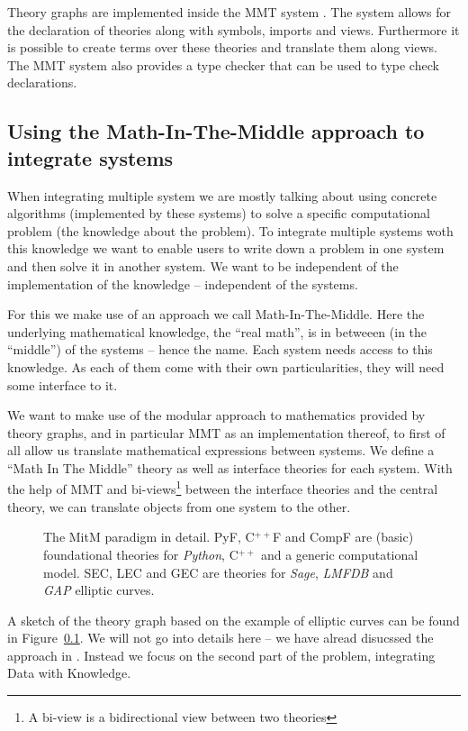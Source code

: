 \documentclass{deliverablereport}
\begin{document}
Theory graphs are implemented inside the MMT system \cite{RabKoh:WSMSML13}. The system allows for the declaration of theories along with symbols, imports and views. Furthermore it is possible to create terms over these theories and translate them along views. The MMT system also provides a type checker that can be used to type check declarations.

\subsection{Using the Math-In-The-Middle approach to integrate systems}\label{sec:mitm}

When integrating multiple system we are mostly talking about using concrete algorithms (implemented by these systems) to solve a specific computational problem (the knowledge about the problem). To integrate multiple systems woth this knowledge we want to enable users to write down a problem in one system and then solve it in another system. We want to be independent of the implementation of the knowledge -- independent of the systems.

For this we make use of an approach we call Math-In-The-Middle. Here the underlying mathematical knowledge, the ``real math'', is in betweeen (in the ``middle'') of the systems -- hence the name. Each system needs access to this knowledge. As each of them come with their own particularities, they will need some interface to it.

We want to make use of the modular approach to mathematics provided by theory graphs, and in particular MMT as an implementation thereof, to first of all allow us translate mathematical expressions between systems. We define a ``Math In The Middle'' theory as well as interface theories for each system. With the help of MMT and bi-views\footnote{A bi-view is a bidirectional view between two theories} between the interface theories and the central theory, we can translate objects from one system to the other.

\begin{figure}[ht]\centering
  
  \caption{The MitM paradigm in detail. PyF, C${}^{++}$F and CompF are (basic) foundational theories for \textit{Python}, C${}^{++}$ and a generic computational model. SEC, LEC and GEC are theories for \textit{Sage}, \textit{LMFDB} and \textit{GAP} elliptic curves.}\label{fig:mitm}
\end{figure}

A sketch of the theory graph based on the example of elliptic curves can be found in Figure~\ref{sec:mitm}. We will not go into details here -- we have alread disucssed the approach in \cite{DehKohKon:iop16}. Instead we focus on the second part of the problem, integrating Data with Knowledge.
\end{document}

